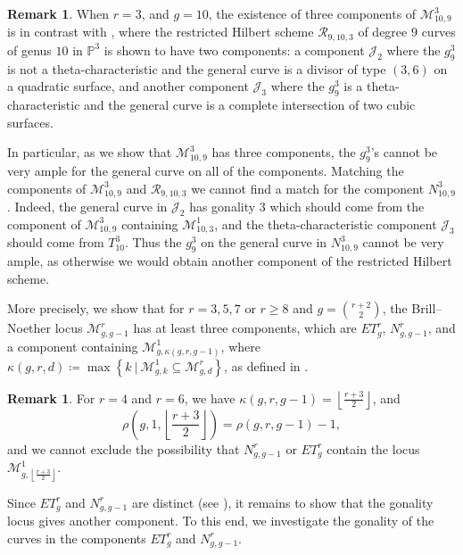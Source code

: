 \documentclass[11pt]{amsart}
\newcommand{\g}[2]{g^{#1}_{#2}}
\newcommand{\BN}[3]{\mathcal{M}^{#2}_{#1,#3}}
\newcommand{\floor}[1]{\left\lfloor #1 \right\rfloor}
\theoremstyle{definition}
\theoremstyle{definition}
\newtheorem{remark}[theorem]{Remark}
\begin{document}
\begin{remark}
	When $r=3$, and $g=10$, the existence of three components of $\BN{10}{3}{9}$ is in contrast with \cite[Exercise~1.41]{Harris_Morrison_book}, where the restricted Hilbert scheme $\mathcal{R}_{9,10,3}$ of degree $9$ curves of genus $10$ in $\mathbb{P}^3$ is shown to have two components: a component $\mathcal{J}_2$ where the $\g{3}{9}$ is not a theta-characteristic and the general curve is a divisor of type $(3,6)$ on a quadratic surface, and another component $\mathcal{J}_3$ where the $\g{3}{9}$ is a theta-characteristic and the general curve is a complete intersection of two cubic surfaces. 
	
	In particular, as we show that $\BN{10}{3}{9}$ has three components, the $\g{3}{9}$'s cannot be very ample for the general curve on all of the components. Matching the components of $\BN{10}{3}{9}$ and $\mathcal{R}_{9,10,3}$ we cannot find a match for the component $N^3_{10,9}$. Indeed, the general curve in $\mathcal{J}_2$ has gonality $3$ which should come from the component of $\BN{10}{3}{9}$ containing $\BN{10}{1}{3}$, and the theta-characteristic component $\mathcal{J}_3$ should come from $T^3_{10}$. Thus the $\g{3}{9}$ on the general curve in $N^3_{10,9}$ cannot be very ample, as otherwise we would obtain another component of the restricted Hilbert scheme.
\end{remark}

More precisely, we show that for $r=3,5,7$ or $r\geq 8$ and $g={r+2 \choose 2}$, the Brill--Noether locus $\BN{g}{r}{g-1}$ has at least three components, which are $ET^r_g$, $N^r_{g,g-1}$, and a component containing $\BN{g}{1}{\kappa(g,r,g-1)}$, where $\kappa(g,r,d)\coloneqq \max \left\{k ~\vert~ \BN{g}{1}{k}\subseteq \BN{g}{r}{d}\right\}$, as defined in \cite{AHL}.

\begin{remark} 
	For $r=4$ and $r=6$, we have $\kappa(g,r,g-1)=\floor{\frac{r+3}{2}}$, and \[\rho\left(g,1,\floor{\frac{r+3}{2}}\right)=\rho(g,r,g-1)-1,\] and we cannot exclude the possibility that $N^r_{g,g-1}$ or $ET^r_{g}$ contain the locus $\BN{g}{1}{\floor{\frac{r+3}{2}}}$.
\end{remark}

Since $ET^r_g$ and $N^r_{g,g-1}$ are distinct (see ), it remains to show that the gonality locus gives another component. To this end, we investigate the gonality of the curves in the components $ET^r_g$ and $N^r_{g,g-1}$.
\end{document}
